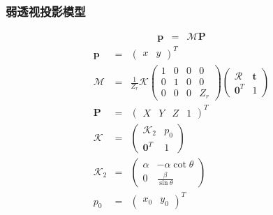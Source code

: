 \documentclass{beamer}
\newcommand{\tmmathbf}[1]{\ensuremath{\boldsymbol{#1}}}
\begin{document}
{{\begin{frame}
  \qquad{}
\end{frame}}{\begin{frame}
  \frametitle{弱透视投影模型}
  \begin{eqnarray*}
    \tmmathbf{p} & = & \mathcal{M}\tmmathbf{P}
  \end{eqnarray*}
  \begin{eqnarray*}
    \tmmathbf{p} & = & \left(\begin{array}{cc}
      x & y
    \end{array}\right)^T\\
    \mathcal{M} & = & \frac{1}{Z_r} \mathcal{K} \left(\begin{array}{cccc}
      1 & 0 & 0 & 0\\
      0 & 1 & 0 & 0\\
      0 & 0 & 0 & Z_r
    \end{array}\right) \left(\begin{array}{cc}
      \mathcal{R} & \tmmathbf{t}\\
      \tmmathbf{0}^T & 1
    \end{array}\right)\\
    \tmmathbf{P} & = & \left(\begin{array}{cccc}
      X & Y & Z & 1
    \end{array}\right)^T\\
    \mathcal{K} & = & \left(\begin{array}{cc}
      \mathcal{K}_2 & p_0\\
      \tmmathbf{0}^T & 1
    \end{array}\right)\\
    \mathcal{K}_2 & = & \left(\begin{array}{cc}
      \alpha & - \alpha \cot \theta\\
      0 & \frac{\beta}{\sin \theta}
    \end{array}\right)\\
    p_0 & = & \left(\begin{array}{cc}
      x_0 & y_0
    \end{array}\right)^T
  \end{eqnarray*}
\end{frame}}{\begin{frame}
  

\end{frame}}}
\end{document}
